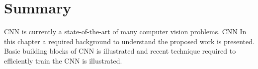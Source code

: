 

\section{Summary}
CNN is currently a state-of-the-art of many computer vision problems. CNN 
In this chapter a required background to understand the proposed work is presented. Basic building blocks of CNN is illustrated and recent technique required to efficiently train the CNN is illustrated.
